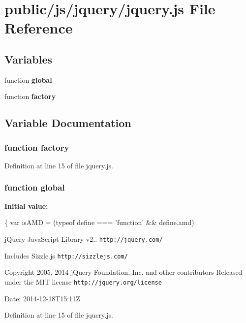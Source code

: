 \section{public/js/jquery/jquery.js File Reference}
\label{jquery_8js}
\subsection*{Variables}
\begin{DoxyCompactItemize}
\item 
function {\bf global}
\item 
function {\bf factory}
\end{DoxyCompactItemize}


\subsection{Variable Documentation}
\subsubsection[{factory}]{\setlength{\rightskip}{0pt plus 5cm}function factory}\label{jquery_8js_abf075bdbe59fd2c3336ed052c9c72b31}


Definition at line 15 of file jquery.\+js.

\subsubsection[{global}]{\setlength{\rightskip}{0pt plus 5cm}function global}\label{jquery_8js_a57efe929cc6b44042891d05e15cec785}
{\bfseries Initial value\+:}
\begin{DoxyCode}
\{
    var isAMD = (typeof define === \textcolor{stringliteral}{'function'} && define.amd)
\end{DoxyCode}
j\+Query Java\+Script Library v2.. {\tt http\+://jquery.\+com/}

Includes Sizzle.\+js {\tt http\+://sizzlejs.\+com/}

Copyright 2005, 2014 j\+Query Foundation, Inc. and other contributors Released under the M\+I\+T license {\tt http\+://jquery.\+org/license}

Date\+: 2014-\/12-\/18\+T15\+:11\+Z 

Definition at line 15 of file jquery.\+js.

